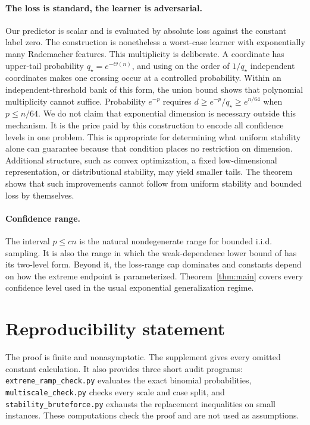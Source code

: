 \documentclass{article}
\newcommand{\1}{\mathbf 1}
\begin{document}
\paragraph{The loss is standard, the learner is adversarial.}
Our predictor is scalar and is evaluated by absolute loss against the constant label zero. The construction is nonetheless a worst-case learner with exponentially many Rademacher features. This multiplicity is deliberate. A coordinate has upper-tail probability $q_\star=e^{-\Theta(n)}$, and using on the order of $1/q_\star$ independent coordinates makes one crossing occur at a controlled probability. Within an independent-threshold bank of this form, the union bound shows that polynomial multiplicity cannot suffice. Probability $e^{-p}$ requires $d\ge e^{-p}/q_\star\ge e^{n/64}$ when $p\le n/64$. We do not claim that exponential dimension is necessary outside this mechanism. It is the price paid by this construction to encode all confidence levels in one problem. This is appropriate for determining what uniform stability alone can guarantee because that condition places no restriction on dimension. Additional structure, such as convex optimization, a fixed low-dimensional representation, or distributional stability, may yield smaller tails. The theorem shows that such improvements cannot follow from uniform stability and bounded loss by themselves.

\paragraph{Confidence range.}
The interval $p\le c n$ is the natural nondegenerate range for bounded i.i.d. sampling. It is also the range in which the weak-dependence lower bound of \citet{bousquet2020} has its two-level form. Beyond it, the loss-range cap dominates and constants depend on how the extreme endpoint is parameterized. Theorem~\ref{thm:main} covers every confidence level used in the usual exponential generalization regime.

\section*{Reproducibility statement}

The proof is finite and nonasymptotic. The supplement gives every omitted constant calculation. It also provides three short audit programs: \texttt{extreme\_ramp\_check.py} evaluates the exact binomial probabilities, \texttt{multiscale\_check.py} checks every scale and case split, and \texttt{stability\_bruteforce.py} exhausts the replacement inequalities on small instances. These computations check the proof and are not used as assumptions.




\appendix

\end{document}
